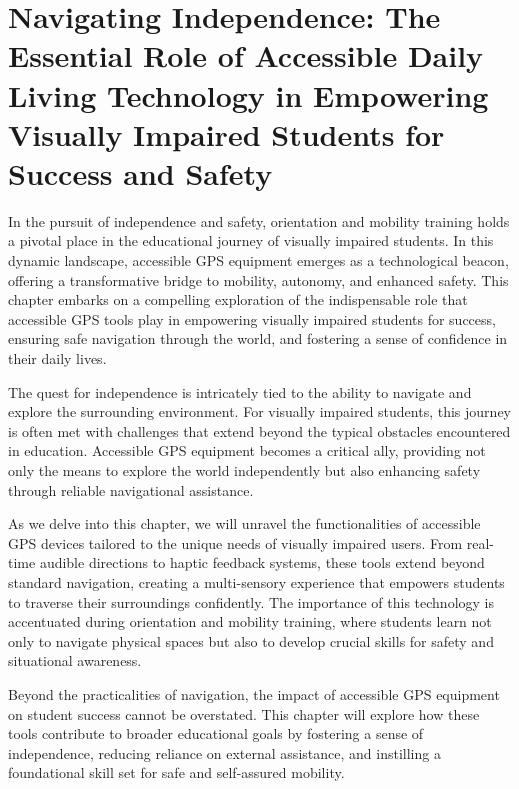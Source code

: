 \hypertarget{accessible-gps-mapping}{}\chapter[\raggedright Navigating Independence:\hfill\break The Essential Role of Accessible Daily Living Technology in\hfill\break Empowering Visually Impaired Students for Success and Safety]{Navigating Independence: The Essential Role of Accessible Daily Living Technology in Empowering Visually Impaired Students for Success and Safety}\label{accessible-gps-mapping}
{\let\clearpage\relax\localtableofcontents\let\clearpage\relax\locallistoftables}\newpage
{}
In the pursuit of independence and safety, orientation and mobility training holds a pivotal place in the educational journey of visually impaired students. In this dynamic landscape, accessible GPS equipment emerges as a technological beacon, offering a transformative bridge to mobility, autonomy, and enhanced safety. This chapter embarks on a compelling exploration of the indispensable role that accessible GPS tools play in empowering visually impaired students for success, ensuring safe navigation through the world, and fostering a sense of confidence in their daily lives.

The quest for independence is intricately tied to the ability to navigate and explore the surrounding environment. For visually impaired students, this journey is often met with challenges that extend beyond the typical obstacles encountered in education. Accessible GPS equipment becomes a critical ally, providing not only the means to explore the world independently but also enhancing safety through reliable navigational assistance.

As we delve into this chapter, we will unravel the functionalities of accessible GPS devices tailored to the unique needs of visually impaired users. From real-time audible directions to haptic feedback systems, these tools extend beyond standard navigation, creating a multi-sensory experience that empowers students to traverse their surroundings confidently. The importance of this technology is accentuated during orientation and mobility training, where students learn not only to navigate physical spaces but also to develop crucial skills for safety and situational awareness.

Beyond the practicalities of navigation, the impact of accessible GPS equipment on student success cannot be overstated. This chapter will explore how these tools contribute to broader educational goals by fostering a sense of independence, reducing reliance on external assistance, and instilling a foundational skill set for safe and self-assured mobility.


